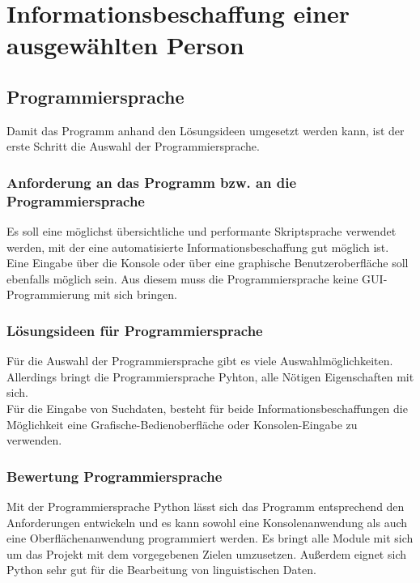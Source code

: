 
\chapter{Informationsbeschaffung einer ausgewählten Person}  %
\label{cha:Informationsbeschaffung einer ausgewählten Person} %

\section{Programmiersprache}
Damit das Programm anhand den Lösungsideen umgesetzt werden kann, ist der erste Schritt die Auswahl der Programmiersprache.
		
	\subsection{Anforderung an das Programm bzw. an die Programmiersprache}
	Es soll eine möglichst übersichtliche und performante Skriptsprache verwendet werden, mit der eine automatisierte Informationsbeschaffung gut möglich ist. Eine Eingabe über die Konsole oder über eine graphische Benutzeroberfläche soll ebenfalls möglich sein. Aus diesem muss die Programmiersprache keine GUI-Programmierung mit sich bringen.
		
	\subsection{ Lösungsideen für Programmiersprache}
	Für die Auswahl der Programmiersprache gibt es viele Auswahlmöglichkeiten. Allerdings bringt die Programmiersprache Pyhton, alle Nötigen Eigenschaften mit sich.\\
	Für die Eingabe von Suchdaten, besteht für beide Informationsbeschaffungen die Möglichkeit eine Grafische-Bedienoberfläche oder Konsolen-Eingabe zu verwenden.
		
	\subsection{Bewertung Programmiersprache}
	Mit der Programmiersprache Python lässt sich das Programm entsprechend den Anforderungen entwickeln und es kann sowohl eine Konsolenanwendung als auch eine Oberflächenanwendung programmiert werden. Es bringt alle Module mit sich um das Projekt mit dem vorgegebenen Zielen umzusetzen. Außerdem eignet sich Python sehr gut für die Bearbeitung von linguistischen Daten. \cite{bird2009natural}
